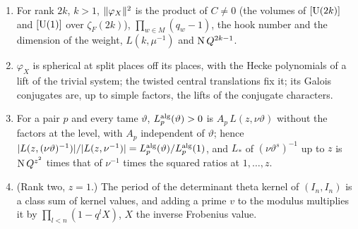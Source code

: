 \begin{proposition}\label{prop:norm-L-value}
\begin{enumerate}[label=\textup{(\alph*)}]
\item For rank $2k$, $k>1$, $\lVert \varphi_X\rVert^2$ is the product of $C\ne0$ (the volumes of $[\operatorname{U}(2k)]$ and $[\operatorname{U}(1)]$ over $\zeta_F(2k)$), $\prod_{w\in M}(q_w-1)$, the hook number and the dimension of the weight,
$L(k,\mu^{-1})$ and $\operatorname{N} Q^{2k-1}$.
\item $\varphi_X$ is spherical at split places off its places, with the Hecke polynomials of a lift of the trivial system; the twisted central translations fix it; its Galois conjugates are, up to simple factors,
the lifts of the conjugate characters.
\item For a pair $p$ and every tame $\vartheta$, $L^{\rm alg}_p(\vartheta)>0$ is $A_p\,L(z,\nu\vartheta)$ without the factors at the level, with $A_p$ independent of $\vartheta$; hence $\lvert L(z,(\nu\vartheta)^{-1})\rvert/\lvert L(z,\nu^{-1})\rvert=L^{\rm alg}_p(\vartheta)/L^{\rm alg}_p(1)$, and
$L_*$ of $(\nu\vartheta^s)^{-1}$ up to $z$ is $\operatorname{N} Q^{z^2}$ times that of $\nu^{-1}$ times the squared ratios at $1,\dots,z$.
\item (Rank two, $z=1$.) The period of the determinant theta kernel of $(I_n,I_n)$ is a class sum of kernel values, and adding a prime $v$ to the modulus multiplies it by $\prod_{l<n}(1-q^lX)$, $X$ the inverse Frobenius value.
\end{enumerate}
\end{proposition}

